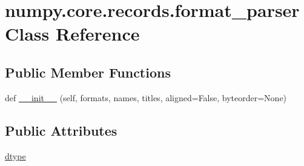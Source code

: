 \hypertarget{classnumpy_1_1core_1_1records_1_1format__parser}{}\section{numpy.\+core.\+records.\+format\+\_\+parser Class Reference}
\label{classnumpy_1_1core_1_1records_1_1format__parser}
\subsection*{Public Member Functions}
\begin{DoxyCompactItemize}
\item 
def \hyperlink{classnumpy_1_1core_1_1records_1_1format__parser_a6dde6659fb3b6d8aecd64b4135be9a99}{\+\_\+\+\_\+init\+\_\+\+\_\+} (self, formats, names, titles, aligned=False, byteorder=None)
\end{DoxyCompactItemize}
\subsection*{Public Attributes}
\begin{DoxyCompactItemize}
\item 
\hyperlink{classnumpy_1_1core_1_1records_1_1format__parser_a58c32390714015baad90c06ebec15af4}{dtype}
\end{DoxyCompactItemize}


